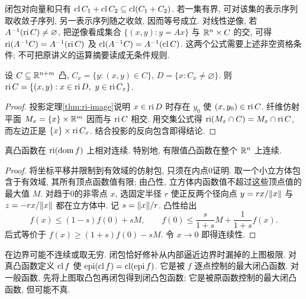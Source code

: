 闭包对向量和只有 $\operatorname{cl} C_1+\operatorname{cl} C_2\subseteq\operatorname{cl}(C_1+C_2)$. 若一集有界, 可对该集的表示序列取收敛子序列, 另一表示序列随之收敛, 因而等号成立. 对线性逆像, 若 $A^{-1}(\operatorname{ri} C)\ne\varnothing$, 把逆像看成集合 $\{(x,y):y=Ax\}$ 与 $\mathbb R^n\times C$ 的交, 可得
$\operatorname{ri}(A^{-1}C)=A^{-1}(\operatorname{ri} C)$ 及 $\operatorname{cl}(A^{-1}C)=A^{-1}(\operatorname{cl} C)$. 这两个公式需要上述非空资格条件; 不可把原讲义的运算摘要读成无条件规则.

\begin{proposition}[纤维公式]
设 $C\subseteq\mathbb R^{n+m}$ 凸, $C_x=\{y:(x,y)\in C\}$, $D=\{x:C_x\ne\varnothing\}$. 则
$\operatorname{ri} C=\{(x,y):x\in\operatorname{ri} D,\ y\in\operatorname{ri} C_x\}$.
\end{proposition}
\begin{proof}
投影定理\ref{thm:ri-image}说明 $x\in\operatorname{ri} D$ 时存在 $y_0$ 使 $(x,y_0)\in\operatorname{ri} C$. 纤维仿射平面 $M_x=\{x\}\times\mathbb R^m$ 因而与 $\operatorname{ri} C$ 相交. 用交集公式得 $\operatorname{ri}(M_x\cap C)=M_x\cap\operatorname{ri} C$, 而左边正是 $\{x\}\times\operatorname{ri} C_x$. 结合投影的反向包含即得结论.
\end{proof}

\begin{theorem}\label{thm:convex-continuity}
真凸函数在 $\operatorname{ri}(\operatorname{dom} f)$ 上相对连续. 特别地, 有限值凸函数在整个 $\mathbb R^n$ 上连续.
\end{theorem}
\begin{proof}
将坐标平移并限制到有效域的仿射包, 只须在内点0证明. 取一个小立方体包含于有效域, 其所有顶点函数值有限; 由凸性, 立方体内函数值不超过这些顶点值的最大值 $M$. 对趋于0的非零点 $x$, 选固定半径 $r$ 使正反两个径向点 $y=rx/\lVert x\rVert$ 与 $z=-rx/\lVert x\rVert$ 都在立方体中. 记 $s=\lVert x\rVert/r$. 凸性给出
\[
f(x)\le(1-s)f(0)+sM,\qquad
f(0)\le\frac{s}{1+s}M+\frac1{1+s}f(x).
\]
后式等价于 $f(x)\ge(1+s)f(0)-sM$. 令 $x\to0$ 即得连续性.
\end{proof}
在边界可能不连续或取无穷. 闭包恰好修补从内部逼近边界时漏掉的上图极限. 对真凸函数定义 $\operatorname{cl} f$ 使 $\operatorname{epi}(\operatorname{cl} f)=\operatorname{cl}(\operatorname{epi} f)$. 它是被 $f$ 逐点控制的最大闭凸函数. 对一般函数, 先将上图取凸包再闭包得到闭凸包函数; 它是被原函数控制的最大闭凸函数, 但可能不真.

